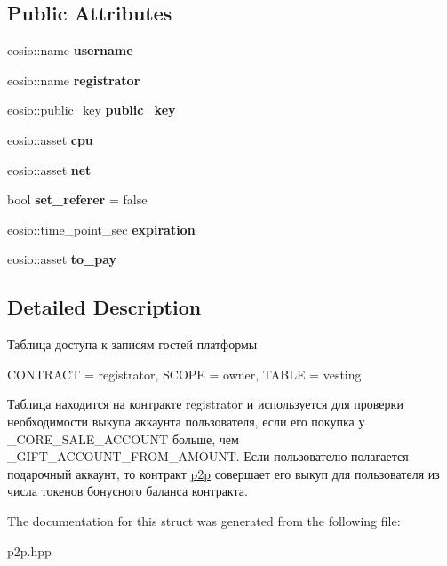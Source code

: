 \subsection*{Public Attributes}
\begin{DoxyCompactItemize}
\item 
\mbox{\label{structguests_a3c550ec3e80d040f7d95f7c9ee500dbe}} 
eosio\+::name {\bfseries username}
\item 
\mbox{\label{structguests_a22effafdbf30a59852f7f7cd82e7b531}} 
eosio\+::name {\bfseries registrator}
\item 
\mbox{\label{structguests_ad2754df2d77b869bd0c4e7e9cedad6a7}} 
eosio\+::public\+\_\+key {\bfseries public\+\_\+key}
\item 
\mbox{\label{structguests_ad1522a74eca90485897b549c857fa4b4}} 
eosio\+::asset {\bfseries cpu}
\item 
\mbox{\label{structguests_a36f81702c9834a45c9ecae49588b2e05}} 
eosio\+::asset {\bfseries net}
\item 
\mbox{\label{structguests_a201b3b738384f53f13965466ef3974d8}} 
bool {\bfseries set\+\_\+referer} = false
\item 
\mbox{\label{structguests_a33cb839d82a59aadd3dbc7879f8b56cf}} 
eosio\+::time\+\_\+point\+\_\+sec {\bfseries expiration}
\item 
\mbox{\label{structguests_a4ac3236a747b7c920f2675a9f8fe35da}} 
eosio\+::asset {\bfseries to\+\_\+pay}
\end{DoxyCompactItemize}


\subsection{Detailed Description}
Таблица доступа к записям гостей платформы 

C\+O\+N\+T\+R\+A\+CT = registrator, S\+C\+O\+PE = owner, T\+A\+B\+LE = vesting

Таблица находится на контракте registrator и используется для проверки необходимости выкупа аккаунта пользователя, если его покупка у \+\_\+\+C\+O\+R\+E\+\_\+\+S\+A\+L\+E\+\_\+\+A\+C\+C\+O\+U\+NT больше, чем \+\_\+\+G\+I\+F\+T\+\_\+\+A\+C\+C\+O\+U\+N\+T\+\_\+\+F\+R\+O\+M\+\_\+\+A\+M\+O\+U\+NT. Если пользователю полагается подарочный аккаунт, то контракт \mbox{\hyperlink{classp2p}{p2p}} совершает его выкуп для пользователя из числа токенов бонусного баланса контракта. 

The documentation for this struct was generated from the following file\+:\begin{DoxyCompactItemize}
\item 
p2p.\+hpp\end{DoxyCompactItemize}

